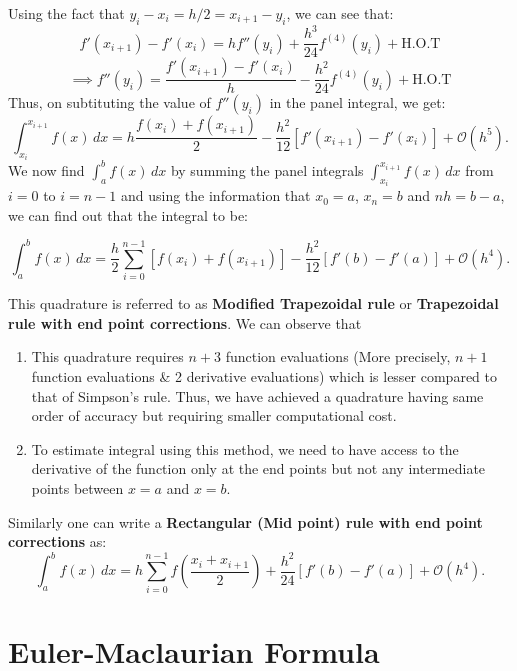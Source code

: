\documentclass[
]{book}
\begin{document}
Using the fact that \(y_i - x_i = h/2 = x_{i+1}-y_i\), we can see that:
\[f'(x_{i+1})-f'(x_i) = hf''(y_i) + \frac{h^3}{24}f^{(4)}(y_i)+\text{H.O.T}\]
\[\implies f''(y_i) = \frac{f'(x_{i+1})-f'(x_i)}{h}-\frac{h^2}{24}f^{(4)}(y_i)+ \text{H.O.T}\]
Thus, on subtituting the value of \(f''(y_i)\) in the panel integral, we get:
\[\int_{x_i}^{x_{i+1}} f(x)\, dx = h \frac{f(x_i)+f(x_{i+1})}{2}  -\frac{h^2}{12}[f'(x_{i+1})-f'(x_i)]+\mathcal{O}(h^5).\]
We now find \(\int_a^b f(x)\, dx\) by summing the panel integrals \(\int_{x_i}^{x_{i+1}}f(x)\, dx\) from \(i=0\) to \(i=n-1\) and using the information that \(x_0 = a\), \(x_n = b\) and \(nh = b-a\), we can find out that the integral to be:

\begin{equation}
\int_a^b f(x)\, dx = \frac{h}{2}\sum_{i=0}^{n-1}[f(x_i)+f(x_{i+1})] - \frac{h^2}{12}[f'(b)-f'(a)]+\mathcal{O}(h^4).
\end{equation}

This quadrature is referred to as \textbf{Modified Trapezoidal rule} or \textbf{Trapezoidal rule with end point corrections}. We can observe that

\begin{enumerate}
\def\labelenumi{\arabic{enumi}.}
\item
  This quadrature requires \(n+3\) function evaluations (More precisely, \(n+1\) function evaluations \& 2 derivative evaluations) which is lesser compared to that of Simpson's rule. Thus, we have achieved a quadrature having same order of accuracy but requiring smaller computational cost.
\item
  To estimate integral using this method, we need to have access to the derivative of the function only at the end points but not any intermediate points between \(x=a\) and \(x=b\).
\end{enumerate}

Similarly one can write a \textbf{Rectangular (Mid point) rule with end point corrections} as:
\begin{equation}
\int_a^b f(x)\, dx = h\sum_{i=0}^{n-1}f\left(\frac{x_i+x_{i+1}}{2}\right) + \frac{h^2}{24}[f'(b)-f'(a)]+\mathcal{O}(h^4).
\end{equation}

\hypertarget{euler-maclaurian-formula}{%
\section{Euler-Maclaurian Formula}\label{euler-maclaurian-formula}}
\end{document}
